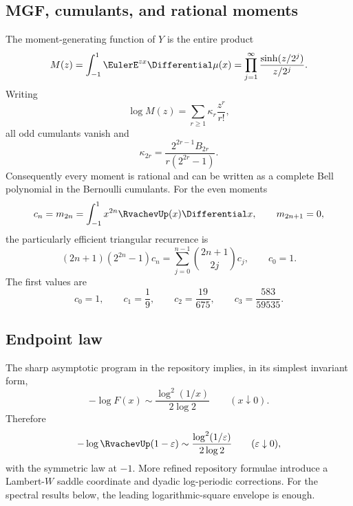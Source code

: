 \documentclass[11pt,oneside]{article}
\theoremstyle{definition}
\theoremstyle{remark}
\numberwithin{equation}{section}
\newcommand{\eps}{\varepsilon}
\begin{document}
\subsection{MGF, cumulants, and rational moments}
The moment-generating function of $Y$ is the entire product
\begin{equation}
 M(z)=\int_{-1}^{1}\EulerE^{zx}\Differential\mu(x)
 =\prod_{j=1}^{\infty}\frac{\sinh(z/2^j)}{z/2^j}.
 \label{eq:mgf-product}
\end{equation}
Writing
\[
 \log M(z)=\sum_{r\ge1}\kappa_r\frac{z^r}{r!},
\]
all odd cumulants vanish and
\begin{equation}
 \kappa_{2r}=\frac{2^{2r-1}B_{2r}}{r(2^{2r}-1)}.
 \label{eq:cumulants}
\end{equation}
Consequently every moment is rational and can be written as a complete Bell
polynomial in the Bernoulli cumulants.  For the even moments
\begin{equation}
 c_n=m_{2n}=\int_{-1}^{1}x^{2n}\RvachevUp(x)\Differential x,
 \qquad m_{2n+1}=0,
 \label{eq:moments}
\end{equation}
the particularly efficient triangular recurrence is
\begin{equation}
 (2n+1)(2^{2n}-1)c_n
 =\sum_{j=0}^{n-1}\binom{2n+1}{2j}c_j,
 \qquad c_0=1.
 \label{eq:moment-recurrence}
\end{equation}
The first values are
\begin{equation}
 c_0=1,
 \qquad c_1=\frac19,
 \qquad c_2=\frac{19}{675},
 \qquad c_3=\frac{583}{59535}.
 \label{eq:first-moments}
\end{equation}

\subsection{Endpoint law}
The sharp asymptotic program in the repository implies, in its simplest
invariant form,
\begin{equation}
 -\log F(x)\sim\frac{\log^2(1/x)}{2\log2}
 \qquad (x\downarrow0).
 \label{eq:endpoint-log-square}
\end{equation}
Therefore
\begin{equation}
 -\log\RvachevUp(1-\eps)\sim\frac{\log^2(1/\eps)}{2\log2}
 \qquad (\eps\downarrow0),
 \label{eq:up-endpoint-log-square}
\end{equation}
with the symmetric law at $-1$.  More refined repository formulae introduce a
Lambert-$W$ saddle coordinate and dyadic log-periodic corrections.  For the
spectral results below, the leading logarithmic-square envelope is enough.
\end{document}
